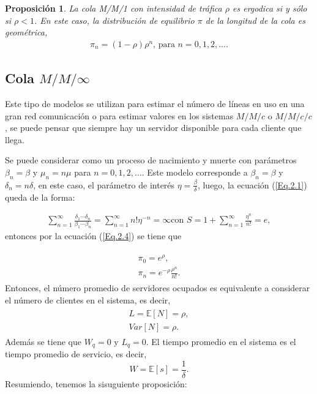 \documentclass{article}
\newtheorem{Prop}{Proposición}[section]
\newcommand{\esp}{\mathbb{E}}
\numberwithin{equation}{section}
\begin{document}
\begin{Prop}
La cola M/M/1 con intensidad de tr\'afica $\rho$ es ergodica si y s\'olo si $\rho<1$. En este caso, la distribuci\'on de equilibrio $\pi$ de la longitud de la cola es geom\'etrica, 
\begin{eqnarray}
\pi_{n}=\left(1-\rho\right)\rho^{n}\textrm{, para }n=0,1,2,\ldots.
\end{eqnarray}
\end{Prop}
\subsection*{Cola $M/M/\infty$}

Este tipo de modelos se utilizan para estimar el n\'umero de l\'ineas en uso en una gran red comunicaci\'on o para estimar valores en los sistemas $M/M/c$ o $M/M/c/c$, se puede pensar que siempre hay un servidor disponible para cada cliente que llega.

Se puede considerar como un proceso de nacimiento y muerte con par\'ametros $\beta_{n}=\beta$ y $\mu_{n}=n\mu$ para $n=0,1,2,\ldots$. Este modelo corresponde a $\beta_{n}=\beta$ y $\delta_{n}=n\delta$, en este caso, el par\'ametro de inter\'es $\eta=\frac{\beta}{\delta}$, luego, la ecuaci\'on (\ref{Eq.2.1}) queda de la forma:

\begin{eqnarray}
\sum_{n=1}^{\infty}\frac{\delta_{1}\cdots\delta_{n}}{\beta_{1}\cdots\beta_{n}}=\sum_{n=1}^{\infty}n!\eta^{-n}=\infty\textrm{con }S=1+\sum_{n=1}^{\infty}\frac{\eta^{n}}{n!}=e,
\end{eqnarray}
 entonces por la ecuaci\'on (\ref{Eq.2.4}) se tiene que

\begin{eqnarray}\label{MMinf.pi}
\begin{array}{l}
\pi_{0}=e^{\rho},\\
\pi_{n}=e^{-\rho}\frac{\rho^{n}}{n!}.
\end{array}
\end{eqnarray}
Entonces, el n\'umero promedio de servidores ocupados es equivalente a considerar el n\'umero de clientes en el  sistema, es decir,
\begin{eqnarray}
\begin{array}{l}
L=\esp\left[N\right]=\rho,\\
Var\left[N\right]=\rho.
\end{array}
\end{eqnarray}
Adem\'as se tiene que $W_{q}=0$ y $L_{q}=0$. El tiempo promedio en el sistema es el tiempo promedio de servicio, es decir, 
\begin{equation}
W=\esp\left[s\right]=\frac{1}{\delta}.
\end{equation}
Resumiendo, tenemos la sisuguiente proposici\'on:
\end{document}
